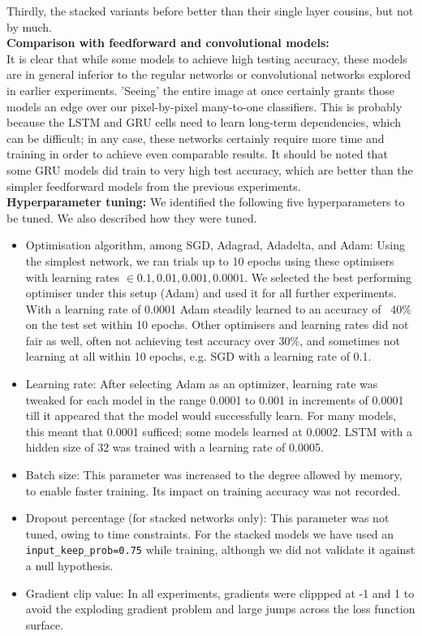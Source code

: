 \documentclass[paper=a4, fontsize=11pt]{scrartcl} %
\numberwithin{equation}{section} %
\numberwithin{figure}{section} %
\numberwithin{table}{section} %
\begin{document}
Thirdly, the stacked variants before better than their single layer cousins, but not by much.\\

\textbf{Comparison with feedforward and convolutional models:} \\
It is clear that while some models to achieve high testing accuracy, these models are in general inferior to the regular networks or convolutional networks explored in earlier experiments. 'Seeing' the entire image at once certainly grants those models an edge over our pixel-by-pixel many-to-one classifiers. This is probably because the LSTM and GRU cells need to learn long-term dependencies, which can be difficult; in any case, these networks certainly require more time and training in order to achieve even comparable results. It should be noted that some GRU models did train to very high test accuracy, which are better than the simpler feedforward models from the previous experiments.\\

\textbf{Hyperparameter tuning:} We identified the following five hyperparameters to be tuned. We also described how they were tuned.
\begin{itemize}
  \item Optimisation algorithm, among SGD, Adagrad, Adadelta, and Adam: Using the simplest network, we ran trials up to 10 epochs using these optimisers with learning rates $\in {0.1, 0.01, 0.001, 0.0001}$. We selected the best performing optimiser under this setup (Adam) and used it for all further experiments. With a learning rate of 0.0001 Adam steadily learned to an accuracy of ~40\% on the test set within 10 epochs. Other optimisers and learning rates did not fair as well, often not achieving test accuracy over 30\%, and sometimes not learning at all within 10 epochs, e.g. SGD with a learning rate of 0.1.
  \item Learning rate: After selecting Adam as an optimizer, learning rate was tweaked for each model in the range 0.0001 to 0.001 in increments of 0.0001 till it appeared that the model would successfully learn. For many models, this meant that 0.0001 sufficed; some models learned at 0.0002. LSTM with a hidden size of 32 was trained with a learning rate of 0.0005.
  \item Batch size: This parameter was increased to the degree allowed by memory, to enable faster training. Its impact on training accuracy was not recorded.
  \item Dropout percentage (for stacked networks only): This parameter was not tuned, owing to time constraints. For the stacked models we have used an \texttt{input\_keep\_prob=0.75} while training, although we did not validate it against a null hypothesis.
  \item Gradient clip value: In all experiments, gradients were clippped at -1 and 1 to avoid the exploding gradient problem and large jumps across the loss function surface.
\end{itemize}
\end{document}
